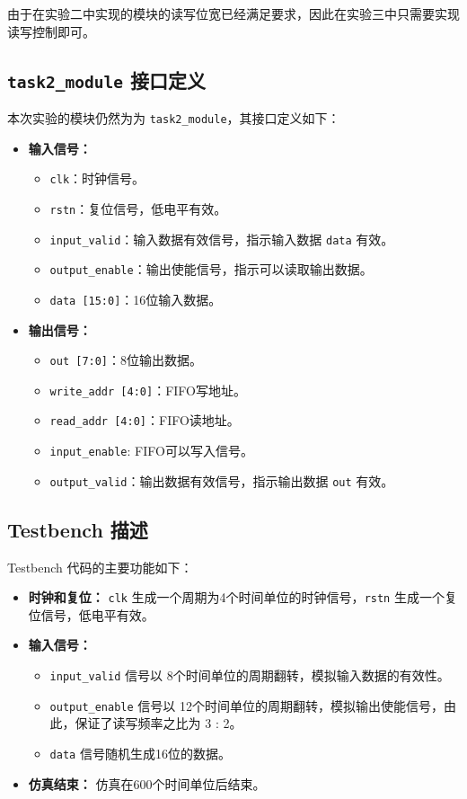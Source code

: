 \documentclass[zihao=5, UTF8]{article}
\theoremstyle{MyLineTheoremStyle} %
\theoremstyle{MyBlockTheoremStyle} %
\theoremstyle{MySubsubsectionStyle} %
\begin{document}
由于在实验二中实现的模块的读写位宽已经满足要求，因此在实验三中只需要实现读写控制即可。

\subsection{\texttt{task2\_module} 接口定义}

本次实验的模块仍然为为 \texttt{task2\_module}，其接口定义如下：

\begin{itemize}
    \item \textbf{输入信号：}
    \begin{itemize}
        \item \texttt{clk}：时钟信号。
        \item \texttt{rstn}：复位信号，低电平有效。
        \item \texttt{input\_valid}：输入数据有效信号，指示输入数据 \texttt{data} 有效。
        \item \texttt{output\_enable}：输出使能信号，指示可以读取输出数据。
        \item \texttt{data [15:0]}：16位输入数据。
    \end{itemize}
    \item \textbf{输出信号：}
    \begin{itemize}
        \item \texttt{out [7:0]}：8位输出数据。
        \item \texttt{write\_addr [4:0]}：FIFO写地址。
        \item \texttt{read\_addr [4:0]}：FIFO读地址。
        \item \texttt{input\_enable}: FIFO可以写入信号。
        \item \texttt{output\_valid}：输出数据有效信号，指示输出数据 \texttt{out} 有效。
    \end{itemize}
\end{itemize}

\subsection{Testbench 描述}
Testbench 代码的主要功能如下：
\begin{itemize}
    \item \textbf{时钟和复位：} \texttt{clk} 生成一个周期为4个时间单位的时钟信号，\texttt{rstn} 生成一个复位信号，低电平有效。
    \item \textbf{输入信号：}
    \begin{itemize}
        \item \texttt{input\_valid} 信号以 8个时间单位的周期翻转，模拟输入数据的有效性。
        \item \texttt{output\_enable} 信号以 12个时间单位的周期翻转，模拟输出使能信号，由此，保证了读写频率之比为 3 : 2。
        \item \texttt{data} 信号随机生成16位的数据。
    \end{itemize}
    \item \textbf{仿真结束：} 仿真在600个时间单位后结束。
\end{itemize}
\end{document}
